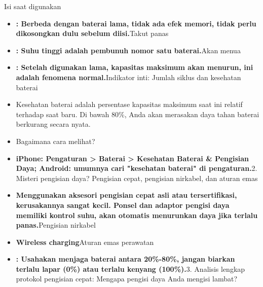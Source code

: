 


Isi saat digunakan

\begin{itemize}
  \item \textbf{: Berbeda dengan baterai lama, tidak ada efek memori, tidak perlu dikosongkan dulu sebelum diisi.}Takut panas
  \item \textbf{: Suhu tinggi adalah pembunuh nomor satu baterai.}Akan menua
  \item \textbf{: Setelah digunakan lama, kapasitas maksimum akan menurun, ini adalah fenomena normal.}Indikator inti: Jumlah siklus dan kesehatan baterai
\end{itemize}


\begin{itemize}
  \item Kesehatan baterai adalah persentase kapasitas maksimum saat ini relatif terhadap saat baru. Di bawah 80\%, Anda akan merasakan daya tahan baterai berkurang secara nyata.
  \item Bagaimana cara melihat?
  \item \textbf{iPhone: Pengaturan > Baterai > Kesehatan Baterai \& Pengisian Daya; Android: umumnya cari "kesehatan baterai" di pengaturan.}2. Misteri pengisian daya? Pengisian cepat, pengisian nirkabel, dan aturan emas
\end{itemize}


\begin{itemize}
  \item \textbf{Menggunakan aksesori pengisian cepat asli atau tersertifikasi, kerusakannya sangat kecil. Ponsel dan adaptor pengisi daya memiliki kontrol suhu, akan otomatis menurunkan daya jika terlalu panas.}Pengisian nirkabel
  \item \textbf{Wireless charging}Aturan emas perawatan
  \item \textbf{: Usahakan menjaga baterai antara 20\%-80\%, jangan biarkan terlalu lapar (0\%) atau terlalu kenyang (100\%).}3. Analisis lengkap protokol pengisian cepat: Mengapa pengisi daya Anda mengisi lambat?
\end{itemize}

